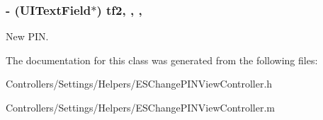\subsubsection[{tf2}]{\setlength{\rightskip}{0pt plus 5cm}-\/ (U\+I\+Text\+Field$\ast$) tf2\hspace{0.3cm}{\ttfamily [read]}, {\ttfamily [write]}, {\ttfamily [nonatomic]}, {\ttfamily [strong]}}\label{interface_e_s_change_p_i_n_view_controller_a23a7550403eae431c07f2412d9edb2b2}
New P\+I\+N. 

The documentation for this class was generated from the following files\+:\begin{DoxyCompactItemize}
\item 
Controllers/\+Settings/\+Helpers/E\+S\+Change\+P\+I\+N\+View\+Controller.\+h\item 
Controllers/\+Settings/\+Helpers/E\+S\+Change\+P\+I\+N\+View\+Controller.\+m\end{DoxyCompactItemize}

